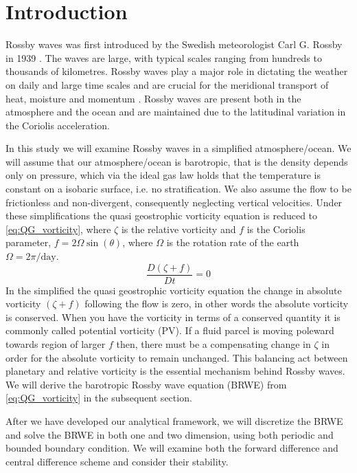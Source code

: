 \section{Introduction}
Rossby waves was first introduced by the Swedish meteorologist
Carl G. Rossby in 1939 \parencite{Rossby1939}. The waves are large, with typical scales ranging from 
hundreds to thousands of kilometres. Rossby waves play a major role in dictating
the weather on daily and large time scales and are crucial for the meridional
transport of heat, moisture and momentum \parencite{midSynDyn}. 
Rossby waves are present both in the atmosphere and the ocean and are maintained
due to the latitudinal variation in the Coriolis acceleration.

In this study we will examine Rossby waves in a simplified 
atmosphere/ocean. We will assume that our atmosphere/ocean is barotropic, that
is the density depends only on pressure, which via the ideal gas law holds that
the temperature is constant on a isobaric surface, i.e. no stratification. We also assume the flow to be frictionless and
non-divergent, consequently neglecting vertical velocities. Under these
simplifications the quasi geostrophic vorticity equation is reduced to
\cref{eq:QG_vorticity}, where $\zeta$ is the relative vorticity and $f$ is the
Coriolis parameter, $f=2\Omega \sin(\theta)$, where $\Omega$ is
the rotation rate of the earth $\Omega = 2\pi/ \mathrm{day}$.
\begin{equation}\label{eq:QG_vorticity}
    \frac{D(\zeta + f)}{Dt} = 0
\end{equation}
In the simplified the quasi geostrophic vorticity equation the
change in absolute vorticity $(\zeta + f)$ following the flow is zero, in other
words the absolute vorticity is conserved. When you have the vorticity in terms
of a conserved quantity it is commonly called potential vorticity (PV). If a fluid parcel is moving
poleward towards region of larger $f$ then, there must be a compensating change
in $\zeta$ in order for the absolute vorticity to remain unchanged. This
balancing act between planetary and relative vorticity is the essential
mechanism behind
Rossby waves. We will derive the barotropic Rossby
wave equation (BRWE) from \cref{eq:QG_vorticity} in the subsequent section.

After we have developed our analytical framework, we will discretize the BRWE
and solve the BRWE in both one and two dimension, using both periodic and
bounded boundary condition. We will examine both the forward
difference and central difference scheme and consider their stability. 